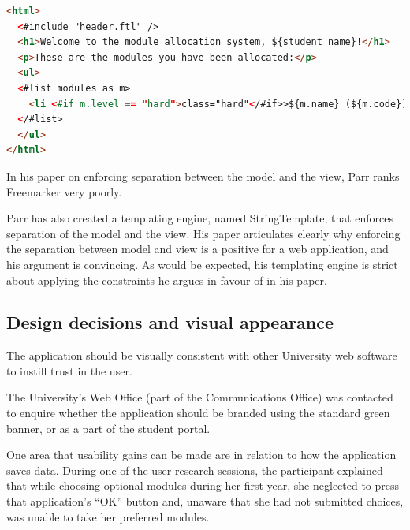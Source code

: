 \documentclass[twoside,draft]{scrartcl}
\begin{document}
\begin{lstlisting}[language=HTML]
<html>
  <#include "header.ftl" />
  <h1>Welcome to the module allocation system, ${student_name}!</h1>
  <p>These are the modules you have been allocated:</p>
  <ul>
  <#list modules as m>
    <li <#if m.level == "hard">class="hard"</#if>>${m.name} (${m.code})</li>
  </#list>
  </ul>
</html>
\end{lstlisting}

In his paper on enforcing separation between the model and the view, Parr
\cite{Parr2004templateengines} ranks Freemarker very poorly.


Parr has also created a templating engine, named StringTemplate, that enforces
separation of the model and the view. His paper articulates clearly why
enforcing the separation between model and view is a positive for a web
application, and his argument is convincing. As would be expected, his
templating engine is strict about applying the constraints he argues in favour
of in his paper.



\subsection{Design decisions and visual appearance}

The application should be visually consistent with other University web
software to instill trust in the user.

The University's Web Office (part of the Communications Office) was contacted
to enquire whether the application should be branded using the standard green
banner, or as a part of the student portal.




One area that usability gains can be made are in relation to how the
application saves data. During one of the user research sessions, the
participant explained that while choosing optional modules during her first
year, she neglected to press that application's ``OK'' button and, unaware
that she had not submitted choices, was unable to take her preferred modules.
\end{document}
